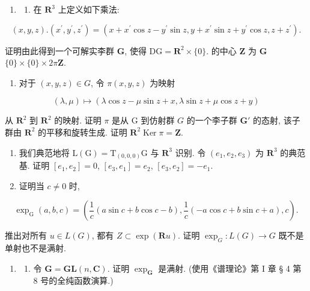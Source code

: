 \begin{enumerate}
\def\labelenumi{\arabic{enumi}.}
\setcounter{enumi}{12}
\tightlist
\item
  \begin{enumerate}
  \def\labelenumii{(\alph{enumii})}
  \tightlist
  \item
    在 \(\mathbf{R}^3\) 上定义如下乘法:
  \end{enumerate}
\end{enumerate}

\[
(x, y, z). (x ^ {\prime}, y ^ {\prime}, z ^ {\prime}) = (x + x ^ {\prime} \cos z - y ^ {\prime} \sin z, y + x ^ {\prime} \sin z + y ^ {\prime} \cos z, z + z ^ {\prime}).
\]

证明由此得到一个可解实李群 \(\mathbf{G}\), 使得 \(\mathrm{DG} = \mathbf{R}^2\times \{0\}\).  的中心 \(\mathbf{Z}\) 为 \(\mathbf{G}\)\(\{0\} \times \{0\} \times 2\pi \mathbf{Z}\).

\begin{enumerate}
\def\labelenumi{(\alph{enumi})}
\setcounter{enumi}{1}
\tightlist
\item
  对于 \((x,y,z)\in G\), 令 \(\pi (x,y,z)\) 为映射
\end{enumerate}

\[
(\lambda , \mu) \mapsto (\lambda \cos z - \mu \sin z + x, \lambda \sin z + \mu \cos z + y)
\]

从 \(\mathbf{R}^2\) 到 \(\mathbf{R}^2\) 的映射. 证明 \(\pi\) 是从 G 到仿射群 \(G\) 的一个李子群 \(\mathbf{G}'\) 的态射, 该子群由 \(\mathbf{R}^2\) 的平移和旋转生成. 证明 \(\mathbf{R}^2\)\(\operatorname{Ker} \pi = \mathbf{Z}\).

\begin{enumerate}
\def\labelenumi{(\alph{enumi})}
\setcounter{enumi}{2}
\item
  我们典范地将 \(\mathrm{L}(\mathrm{G}) = \mathrm{T}_{(0,0,0)}\mathrm{G}\) 与 \(\mathbf{R}^3\) 识别. 令 \((e_1, e_2, e_3)\) 为 \(\mathbf{R}^3\) 的典范基. 证明 \([e_1, e_2] = 0\), \([e_3, e_1] = e_2\), \([e_3, e_2] = -e_1\).
\item
  证明当 \(c \neq 0\) 时,
\end{enumerate}

\[
\exp_ {\mathrm{G}} (a, b, c) = \left(\frac {1}{c} (a \sin c + b \cos c - b), \frac {1}{c} (- a \cos c + b \sin c + a), c\right).
\]

推出对所有 \(u \in L(G)\), 都有 \(Z \subset \exp(\mathbf{R}u)\). 证明 \(\exp_G: L(G) \to G\) 既不是单射也不是满射.

\begin{enumerate}
\def\labelenumi{\arabic{enumi}.}
\setcounter{enumi}{13}
\tightlist
\item
  \begin{enumerate}
  \def\labelenumii{(\alph{enumii})}
  \tightlist
  \item
    令 \(\mathbf{G} = \mathbf{GL}(n, \mathbf{C})\). 证明 \(\exp_{\mathbf{G}}\) 是满射. (使用《谱理论》第 I 章 § 4 第 8 号的全纯函数演算.)
  \end{enumerate}
\end{enumerate}

